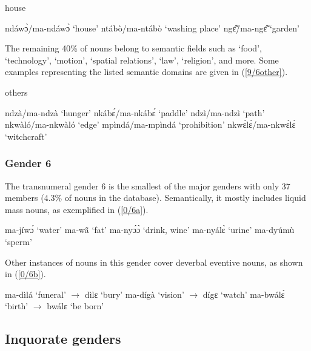 \begin{exe}
\ex\label{9/6house} house
\begin{xlist}
\ex ndáwɔ̀/ma-ndáwɔ̀ `house'
\ex ntábò/ma-ntábò `washing place'
\ex ngɛ̃̂/ma-ngɛ̃̂ `garden'
\end{xlist}
\end{exe}

\noindent The remaining 40\% of nouns belong to semantic fields such as `food', `technology', `motion', `spatial relations', `law', `religion', and more. Some examples representing the listed semantic domains are given in (\ref{9/6other}).

\begin{exe}
\ex\label{9/6other} others
\begin{xlist}
\ex ndzà/ma-ndzà `hunger'
\ex nkábɛ́/ma-nkábɛ́ `paddle'
\ex ndzì/ma-ndzì `path'
\ex nkwàló/ma-nkwàló `edge'
\ex mpìndá/ma-mpìndá `prohibition'
\ex nkwɛ́lɛ̀/ma-nkwɛ́lɛ̀ `witchcraft'
\end{xlist}
\end{exe}

\subsubsection{Gender 6} 
\label{sec:6}

The transnumeral gender 6 is the smallest of the major genders with only 37 members (4.3\% of nouns in the database). Semantically, it mostly includes liquid mass nouns, as exemplified in (\ref{0/6a}).

\begin{exe}
\ex\label{0/6a}
\begin{xlist}
\ex ma-jíwɔ́ `water'
\ex ma-wã̂ `fat'
\ex ma-nyɔ́ɔ̀ `drink, wine'
\ex ma-nyálɛ̀ `urine'
\ex ma-dyúmù `sperm'
\end{xlist}
\end{exe}

\noindent Other instances of nouns in this gender cover deverbal eventive nouns, as shown in (\ref{0/6b}).

\begin{exe}
\ex\label{0/6b}
\begin{xlist}
\ex ma-dìlá `funeral' $\rightarrow$ dìlɛ `bury'
\ex ma-dígà `vision' $\rightarrow$ dígɛ `watch'
\ex ma-bwálɛ́ `birth' $\rightarrow$ bwálɛ `be born'
\end{xlist}
\end{exe}


\subsection{Inquorate genders}
\label{sec:MinGen}

